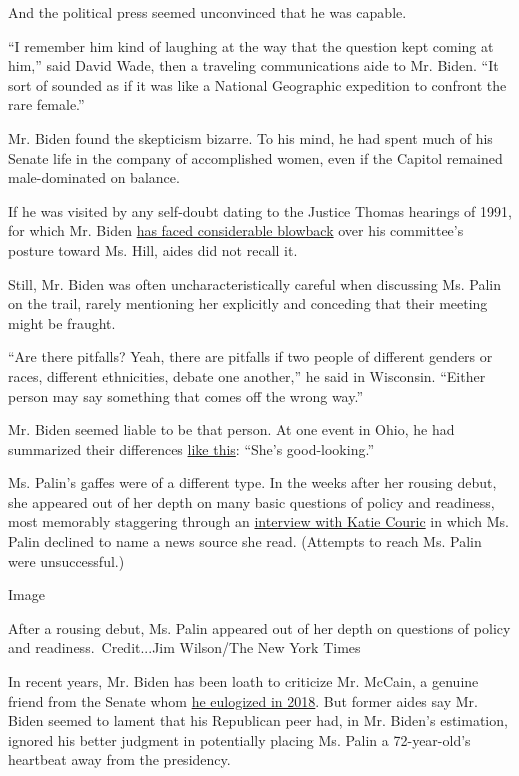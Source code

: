 And the political press seemed unconvinced that he was capable.

``I remember him kind of laughing at the way that the question kept
coming at him,'' said David Wade, then a traveling communications aide
to Mr. Biden. ``It sort of sounded as if it was like a National
Geographic expedition to confront the rare female.''

Mr. Biden found the skepticism bizarre. To his mind, he had spent much
of his Senate life in the company of accomplished women, even if the
Capitol remained male-dominated on balance.

If he was visited by any self-doubt dating to the Justice Thomas
hearings of 1991, for which Mr. Biden
\href{https://www.nytimes.com/2019/04/26/us/politics/anita-hill-biden-clarence-thomas.html}{has
faced considerable blowback} over his committee's posture toward Ms.
Hill, aides did not recall it.

Still, Mr. Biden was often uncharacteristically careful when discussing
Ms. Palin on the trail, rarely mentioning her explicitly and conceding
that their meeting might be fraught.

``Are there pitfalls? Yeah, there are pitfalls if two people of
different genders or races, different ethnicities, debate one another,''
he said in Wisconsin. ``Either person may say something that comes off
the wrong way.''

Mr. Biden seemed liable to be that person. At one event in Ohio, he had
summarized their differences
\href{http://blogs.reuters.com/talesfromthetrail/2008/08/31/difference-between-biden-and-palin-shes-good-looking/}{like
this}: ``She's good-looking.''

Ms. Palin's gaffes were of a different type. In the weeks after her
rousing debut, she appeared out of her depth on many basic questions of
policy and readiness, most memorably staggering through an
\href{https://www.youtube.com/watch?v=-ZVh_u5RyiU}{interview with Katie
Couric} in which Ms. Palin declined to name a news source she read.
(Attempts to reach Ms. Palin were unsuccessful.)

Image

After a rousing debut, Ms. Palin appeared out of her depth on questions
of policy and readiness.~Credit...Jim Wilson/The New York Times

In recent years, Mr. Biden has been loath to criticize Mr. McCain, a
genuine friend from the Senate whom
\href{https://www.nytimes.com/2018/08/30/us/politics/john-mccain-memorial.html}{he
eulogized in 2018}. But former aides say Mr. Biden seemed to lament that
his Republican peer had, in Mr. Biden's estimation, ignored his better
judgment in potentially placing Ms. Palin a 72-year-old's heartbeat away
from the presidency.

